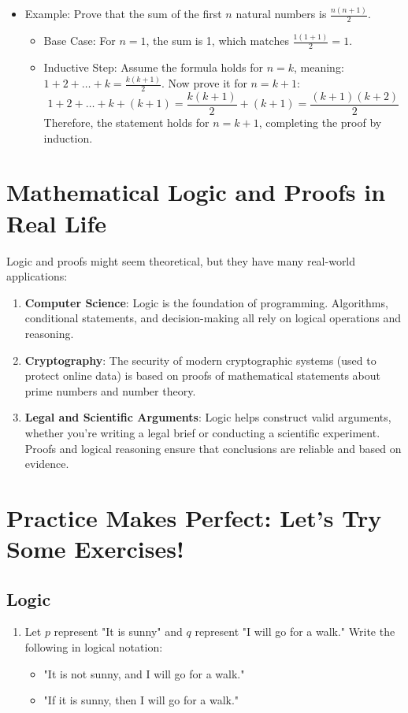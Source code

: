 \begin{enumerate}
\begin{itemize}
        \item Example: Prove that the sum of the first \( n \) natural numbers is \( \frac{n(n+1)}{2} \).
        \begin{itemize}
            \item Base Case: For \( n = 1 \), the sum is 1, which matches \( \frac{1(1+1)}{2} = 1 \).
            \item Inductive Step: Assume the formula holds for \( n = k \), meaning: \( 1 + 2 + \dots + k = \frac{k(k+1)}{2} \). Now prove it for \( n = k + 1 \):
            \[ 1 + 2 + \dots + k + (k+1) = \frac{k(k+1)}{2} + (k+1) = \frac{(k+1)(k+2)}{2} \]
            Therefore, the statement holds for \( n = k + 1 \), completing the proof by induction.
        \end{itemize}
    \end{itemize}
\end{enumerate}

\section{Mathematical Logic and Proofs in Real Life}
Logic and proofs might seem theoretical, but they have many real-world applications:
\begin{enumerate}
    \item \textbf{Computer Science}: Logic is the foundation of programming. Algorithms, conditional statements, and decision-making all rely on logical operations and reasoning.
    \item \textbf{Cryptography}: The security of modern cryptographic systems (used to protect online data) is based on proofs of mathematical statements about prime numbers and number theory.
    \item \textbf{Legal and Scientific Arguments}: Logic helps construct valid arguments, whether you're writing a legal brief or conducting a scientific experiment. Proofs and logical reasoning ensure that conclusions are reliable and based on evidence.
\end{enumerate}

\section{Practice Makes Perfect: Let’s Try Some Exercises!}
\subsection{Logic}
\begin{enumerate}
    \item Let \( p \) represent "It is sunny" and \( q \) represent "I will go for a walk." Write the following in logical notation:
    \begin{itemize}
        \item "It is not sunny, and I will go for a walk."
        \item "If it is sunny, then I will go for a walk."
    \end{itemize}
\end{enumerate}

